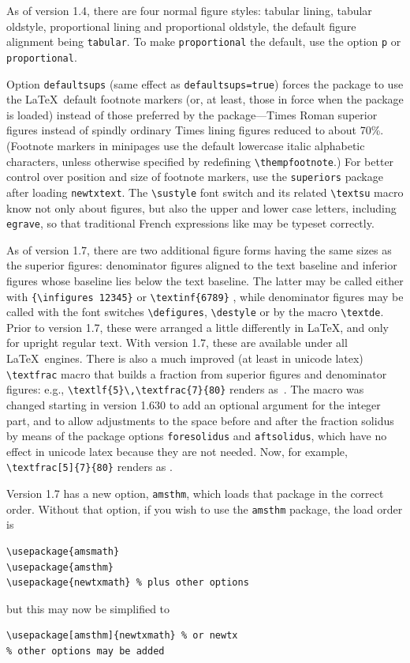 \documentclass[\fsc]{article}
\theoremstyle{oldplain}
\theoremstyle{plain}
\begin{document}
As of version 1.4, there are four normal figure styles: tabular lining, tabular oldstyle, proportional lining and proportional oldstyle, the default figure alignment being \texttt{tabular}. To make \texttt{proportional} the default, use the option \texttt{p} or \texttt{proportional}.

Option {\tt defaultsups} (same effect as {\tt defaultsups=true}) forces the package to use the \LaTeX\ default footnote markers (or, at least, those in force when the package is loaded) instead of those preferred by the package---Times Roman superior figures instead of spindly ordinary Times lining figures reduced to about 70\%. (Footnote markers in minipages use the default lowercase italic alphabetic characters, unless otherwise specified by redefining \verb|\thempfootnote|.) For better control over position and size of footnote markers, use the {\tt superiors} package after loading {\tt newtxtext}. The \verb|\sustyle| font switch and its related \verb|\textsu| macro know not only about figures, but also the upper and lower case letters, including \texttt{egrave}, so that traditional French expressions like  may be typeset correctly.

As of version 1.7, there are two additional figure forms having the same sizes as the superior figures: denominator figures aligned to the text baseline and inferior figures whose baseline lies below the text baseline. The latter may be called either with \verb|{\infigures 12345}| {} or \verb|\textinf{6789}| , while denominator figures may be called with the font switches \verb|\defigures|, \verb|\destyle| or by the macro \verb|\textde|. Prior to version 1.7, these were arranged a little differently in LaTeX, and only for upright regular text. With version 1.7, these are available under all \LaTeX\ engines. There is also a much improved (at least in unicode latex) \verb|\textfrac| macro that builds a fraction from superior figures and denominator figures: e.g., \verb|\textlf{5}\,\textfrac{7}{80}| renders as \,. The macro was changed starting in version 1.630 to add an optional argument for the integer part, and to allow adjustments to the space before and after the fraction solidus by means of the package options {\tt foresolidus} and {\tt aftsolidus}, which have no effect in unicode latex because they are not needed. Now, for example, \verb|\textfrac[5]{7}{80}| renders as .

Version 1.7 has a new option, {\tt amsthm}, which loads that package in the correct order. Without that option, if you wish to use the {\tt amsthm} package, the load order is
\begin{verbatim}
\usepackage{amsmath}
\usepackage{amsthm}
\usepackage{newtxmath} % plus other options
\end{verbatim}
but this may now be simplified to
\begin{verbatim}
\usepackage[amsthm]{newtxmath} % or newtx
% other options may be added
\end{verbatim}
\end{document}
